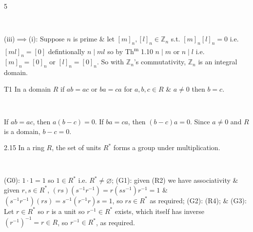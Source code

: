 \documentclass[8pt]{extarticle}
\makeatletter
\renewenvironment{proof}[1][\proofname]{%
  \pushQED{\qed}%
  \par\noindent\normalfont\itshape #1\@addpunct{.}\ \normalfont\ignorespaces
}{%
  \popQED%
  \par
}
\makeatother
\begin{document}
\begin{multicols*}{5}
\begin{proof}
            (iii)\(\implies\)(i):
            Suppose \(n\) is prime \& let \([m]_n,[l]_n\in\mathbb{Z}_n\) s.t. \([m]_n[l]_n=0\) i.e. \([ml]_n=[0]\) defintionally \(n\mid ml\) so by Th\textsuperscript{m} 1.10 \(n\mid m\) or \(n\mid l\) i.e. \([m]_n=[0]_n\) or \([l]_n=[0]_n\). So with \(\mathbb{Z}_n\)'s commutativity, \(\mathbb{Z}_n\) is an integral domain.
        \end{proof}

        \begin{proposition}{T1}
            In a domain \(R\) if \(ab=ac\) or \(ba=ca\) for \(a,b,c\in R\) \& \(a\ne0\) then \(b=c\).
        \end{proposition}

        \begin{proof}
            If \(ab=ac\), then \(a(b-c)=0\). If \(ba=ca\), then \((b-c)a=0\). Since \(a\ne0\) and \(R\) is a domain, \(b-c=0\).        
        \end{proof}

        \begin{lemma}{2.15}
            In a ring \(R\), the set of units \(R^*\) forms a group under multiplication.
        \end{lemma}

        \begin{proof}
            (G0): \(1\cdot1=1\) so \(1\in R^*\) i.e. \(R^*\ne\varnothing\); (G1): given (R2) we have associativity \& given \(r,s\in R^*\), \((rs)(s^{-1}r^{-1})=r(ss^{-1})r^{-1}=1\) \&
            \((s^{-1}r^{-1})(rs)=s^{-1}(r^{-1}r)s=1\), so \(rs\in R^*\) as required; (G2): (R4); \& (G3): Let \(r\in R^*\) so \(r\) is a unit so \(r^{-1}\in R^*\) exists, which itself has inverse \((r^{-1})^{-1}=r\in R\), so \(r^{-1}\in R^*\), as required.

        \end{proof}

        \vspace{-2pt}
        \noindent{}
\end{multicols*}
\end{document}

